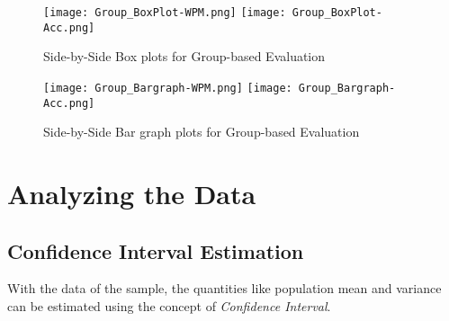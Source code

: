 \documentclass[12pt,a4paper]{report}
\begin{document}
\newpage
\begin{figure}[h]
    \centering
    \texttt{[image: Group\_BoxPlot-WPM.png]}
    \texttt{[image: Group\_BoxPlot-Acc.png]}
    \caption{Side-by-Side Box plots for Group-based Evaluation}
\end{figure}
\begin{figure}[h]
    \centering
    \texttt{[image: Group\_Bargraph-WPM.png]}
    \texttt{[image: Group\_Bargraph-Acc.png]}
    \caption{Side-by-Side Bar graph plots for Group-based Evaluation}
\end{figure}

\newpage
\section*{\Huge{Analyzing the Data}}
\subsection*{\LARGE{Confidence Interval Estimation}}
With the data of the sample, the quantities like population mean and variance can be estimated using the concept of \emph{Confidence Interval}.
\end{document}
